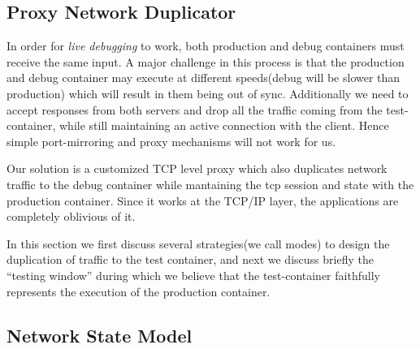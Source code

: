 
\subsection{Proxy Network Duplicator} 
\label{sec:proxyDuplicator}

In order for \textit{live debugging} to work, both production and debug containers must receive the same input.
A major challenge in this process is that the production and debug container may execute at different speeds(debug will be slower than production) which will result in them being out of sync.
Additionally we need to accept responses from both servers and drop all the traffic coming from the test-container, while still maintaining an active connection with the client.
Hence simple port-mirroring and proxy mechanisms will not work for us.

Our solution is a customized TCP level proxy which also duplicates network traffic to the debug container while mantaining the tcp session and state with the production container. 
Since it works at the TCP/IP layer, the applications are completely oblivious of it.

In this section we first discuss several strategies(we call modes) to design the duplication of traffic to the test container, and next we discuss briefly the ``testing window'' during which we believe that the test-container faithfully represents the execution of the production container. 

%





\iffalse
\subsection{Network State Model}
\label{sec:networkStateModel}

